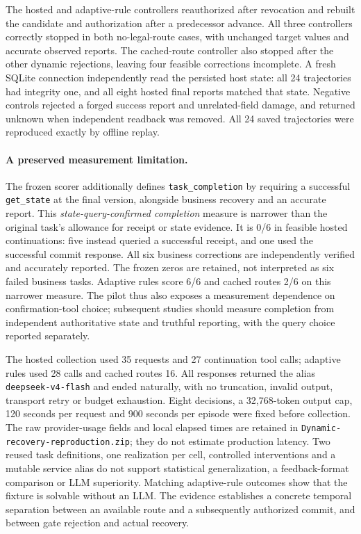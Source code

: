 The hosted and adaptive-rule controllers reauthorized after revocation and rebuilt
the candidate and authorization after a predecessor advance. All three controllers
correctly stopped in both no-legal-route cases, with unchanged target values and
accurate observed reports. The cached-route controller also stopped after the
other dynamic rejections, leaving four feasible corrections incomplete. A fresh
SQLite connection independently read the persisted host state: all 24 trajectories
had integrity one, and all eight hosted final reports matched that state. Negative
controls rejected a forged success report and unrelated-field damage, and returned
unknown when independent readback was removed. All 24 saved trajectories were
reproduced exactly by offline replay.

\paragraph{A preserved measurement limitation.}
The frozen scorer additionally defines \texttt{task\_completion} by requiring a
successful \texttt{get\_state} at the final version, alongside business recovery
and an accurate report. This \emph{state-query-confirmed completion} measure is
narrower than the original task's allowance for receipt or state evidence. It is
0/6 in feasible hosted continuations: five instead queried a successful receipt,
and one used the successful commit response. All six business corrections are
independently verified and accurately reported. The frozen zeros are retained,
not interpreted as six failed business tasks. Adaptive rules score 6/6 and cached
routes 2/6 on this narrower measure. The pilot thus also exposes a measurement
dependence on confirmation-tool choice; subsequent studies should measure
completion from independent authoritative state and truthful reporting, with the
query choice reported separately.

The hosted collection used 35 requests and 27 continuation tool calls; adaptive
rules used 28 calls and cached routes 16. All responses returned the alias
\texttt{deepseek-v4-flash} and ended naturally, with no truncation, invalid output,
transport retry or budget exhaustion. Eight decisions, a 32,768-token output cap,
120 seconds per request and 900 seconds per episode were fixed before collection.
The raw provider-usage fields and local elapsed times are retained in
\texttt{Dynamic-recovery-reproduction.zip}; they do not estimate production latency.
Two reused task definitions, one realization per cell, controlled interventions
and a mutable service alias do not support statistical generalization, a
feedback-format comparison or LLM superiority. Matching adaptive-rule outcomes
show that the fixture is solvable without an LLM. The evidence establishes a
concrete temporal separation between an available route and a subsequently
authorized commit, and between gate rejection and actual recovery.
